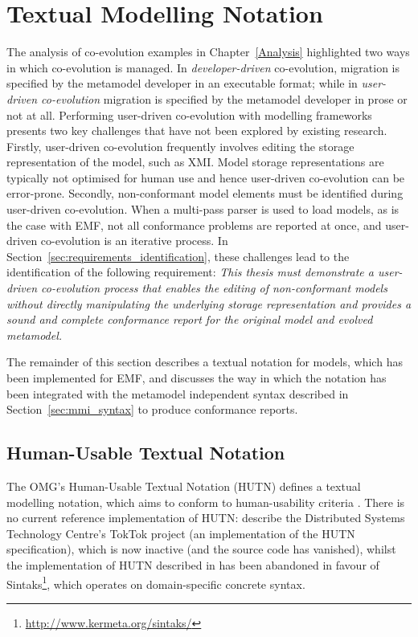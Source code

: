 
\section{Textual Modelling Notation}
\label{sec:notation}
The analysis of co-evolution examples in Chapter~\ref{Analysis} highlighted two ways in which co-evolution is managed. In \emph{developer-driven} co-evolution, migration is specified by the metamodel developer in an executable format; while in \emph{user-driven co-evolution} migration is specified by the metamodel developer in prose or not at all. Performing user-driven co-evolution with modelling frameworks presents two key challenges that have not been explored by existing research. Firstly, user-driven co-evolution frequently involves editing the storage representation of the model, such as XMI. Model storage representations are typically not optimised for human use and hence user-driven co-evolution can be error-prone. Secondly, non-conformant model elements must be identified during user-driven co-evolution. When a multi-pass parser is used to load models, as is the case with EMF, not all conformance problems are reported at once, and user-driven co-evolution is an iterative process. In Section~\ref{sec:requirements_identification}, these challenges lead to the identification of the following requirement: \emph{This thesis must demonstrate a user-driven co-evolution process that enables the editing of non-conformant models without directly manipulating the underlying storage representation and provides a sound and complete conformance report for the original model and evolved metamodel.}

The remainder of this section describes a textual notation for models, which has been implemented for EMF, and discusses the way in which the notation has been integrated with the metamodel independent syntax described in Section~\ref{sec:mmi_syntax} to produce conformance reports. 


\subsection{Human-Usable Textual Notation}
\label{subsec:hutn}
The OMG's Human-Usable Textual Notation (HUTN) \cite{hutn} defines a textual modelling notation, which aims to conform to human-usability criteria \cite{hutn}. There is no current reference implementation of HUTN: \cite{steel01hutn} describe the Distributed Systems Technology Centre's TokTok project (an implementation of the HUTN specification), which is now inactive (and the source code has vanished), whilst the implementation of HUTN described in \cite{muller05hutn} has been abandoned in favour of Sintaks\footnote{\url{http://www.kermeta.org/sintaks/}}, which operates on domain-specific concrete syntax.

